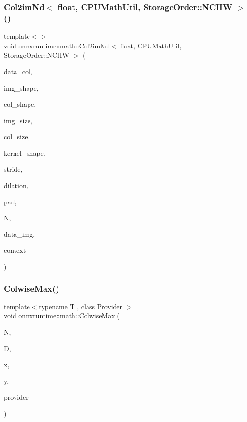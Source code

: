 \subsubsection{\texorpdfstring{Col2im\+Nd$<$ float, C\+P\+U\+Math\+Util, Storage\+Order\+::\+N\+C\+H\+W $>$()}{Col2imNd< float, CPUMathUtil, StorageOrder::NCHW >()}}
{\footnotesize\ttfamily template$<$$>$ \\
\mbox{\hyperlink{mlasi_8h_a88f941d423cb2a819b70a1358982b1a6}{void}} \mbox{\hyperlink{namespaceonnxruntime_1_1math_a4904838f1a00eba6f7a19daf7c959f37}{onnxruntime\+::math\+::\+Col2im\+Nd}}$<$ float, \mbox{\hyperlink{classonnxruntime_1_1CPUMathUtil}{C\+P\+U\+Math\+Util}}, Storage\+Order\+::\+N\+C\+HW $>$ (\begin{DoxyParamCaption}\item[{const float $\ast$}]{data\+\_\+col,  }\item[{const int64\+\_\+t $\ast$}]{img\+\_\+shape,  }\item[{const int64\+\_\+t $\ast$}]{col\+\_\+shape,  }\item[{const int64\+\_\+t}]{img\+\_\+size,  }\item[{const int64\+\_\+t}]{col\+\_\+size,  }\item[{const int64\+\_\+t $\ast$}]{kernel\+\_\+shape,  }\item[{const int64\+\_\+t $\ast$}]{stride,  }\item[{const int64\+\_\+t $\ast$}]{dilation,  }\item[{const int64\+\_\+t $\ast$}]{pad,  }\item[{const int64\+\_\+t}]{N,  }\item[{float $\ast$}]{data\+\_\+img,  }\item[{\mbox{\hyperlink{classonnxruntime_1_1CPUMathUtil}{C\+P\+U\+Math\+Util}} $\ast$}]{context }\end{DoxyParamCaption})}

\mbox{\label{namespaceonnxruntime_1_1math_a263543a2844b61ba091ad8d0e341557f}} 
\subsubsection{\texorpdfstring{Colwise\+Max()}{ColwiseMax()}}
{\footnotesize\ttfamily template$<$typename T , class Provider $>$ \\
\mbox{\hyperlink{mlasi_8h_a88f941d423cb2a819b70a1358982b1a6}{void}} onnxruntime\+::math\+::\+Colwise\+Max (\begin{DoxyParamCaption}\item[{const int}]{N,  }\item[{const int}]{D,  }\item[{const T $\ast$}]{x,  }\item[{T $\ast$}]{y,  }\item[{Provider $\ast$}]{provider }\end{DoxyParamCaption})}

